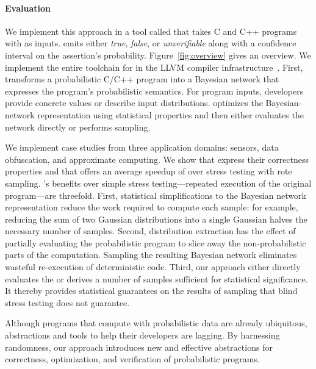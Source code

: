 \paragraph*{Evaluation}
We implement this approach in a tool called \tool that takes C and C++
programs with \passerts as inputs. \tool emits either \emph{true},
\emph{false}, or \emph{unverifiable} along with a confidence interval
on the assertion's probability.  Figure~\ref{fig:overview} gives an
overview.  We implement the entire toolchain for \tool in the LLVM
compiler infrastructure~\cite{llvm}.  First, \tool transforms a
probabilistic C/C++ program into a Bayesian network that expresses the
program's probabilistic semantics. For program inputs, developers
provide concrete values or describe input distributions. \tool
optimizes the Bayesian-network
representation using statistical properties and then either
evaluates the network directly or performs sampling.

We implement case
studies from three application domains: sensors, data obfuscation, and
approximate computing.  We show that \passerts express their
correctness properties and that \mayhap offers an average speedup of
 over stress testing with rote
sampling.
\tool's benefits over simple stress testing---repeated execution of
the original program---are threefold. First, statistical
simplifications to the Bayesian network representation reduce the work
required to compute each sample:
for example, reducing the sum of two
Gaussian distributions into a single Gaussian halves the necessary
number of samples.
Second, distribution extraction has the effect of
partially evaluating the probabilistic program to slice away the
non-probabilistic parts of the computation. Sampling the resulting
Bayesian network eliminates wasteful re-execution of deterministic
code. Third, our approach either directly evaluates the \passert or derives
a number of samples sufficient for statistical significance.
It thereby provides statistical guarantees
on the results of sampling that blind stress testing does not guarantee.

Although programs that compute with probabilistic data are already
ubiquitous, abstractions and tools to help their developers are
lagging.  By harnessing randomness, our approach introduces new and
effective abstractions for correctness, optimization, and
verification of probabilistic programs.


